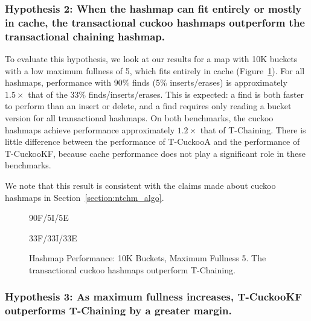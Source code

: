 \subsubsection{Hypothesis 2: When the hashmap can fit entirely or mostly in cache, the transactional cuckoo hashmaps outperform the transactional chaining hashmap.}

To evaluate this hypothesis, we look at our results for a map with 10K buckets with a low maximum fullness of 5, which fits entirely in cache (Figure~\ref{fig:hm_5}).
For all hashmaps, performance with 90\% finds (5\% inserts/erases) is approximately $1.5\times$ that of the 33\% finds/inserts/erases. This is expected: a find is both faster to perform than an insert or delete, and a find requires only reading a bucket version for all transactional hashmaps.
On both benchmarks, the cuckoo hashmaps achieve performance approximately $1.2\times$ that of T-Chaining. There is little difference between the performance of T-CuckooA and the performance of T-CuckooKF, because cache performance does not play a significant role in these benchmarks.

We note that this result is consistent with the claims made about cuckoo hashmaps in Section~\ref{section:ntchm_algo}.

\vspace{12pt}
\noindent{}

\begin{figure}[H]
    \centering
    \begin{minipage}{0.75\textwidth}
	\caption*{90F/5I/5E}
        \vspace{12pt}
    \end{minipage}
    \begin{minipage}{0.75\textwidth}
	\caption*{33F/33I/33E}
    \end{minipage}
    \caption[Hashmap Performance: 10K Buckets, Maximum Fullness 5]{Hashmap Performance: 10K Buckets, Maximum Fullness 5. The transactional cuckoo hashmaps outperform T-Chaining.}
    \label{fig:hm_5}
\end{figure}


\subsubsection{Hypothesis 3: As maximum fullness increases, T-CuckooKF outperforms T-Chaining by a greater margin.}

